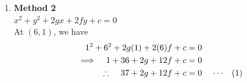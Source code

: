 \documentclass[11pt,a4paper]{article}
\begin{document}
\begin{enumerate}
Gradient of $BC =\dfrac{3 - 2}{2 - 3} = -1$ 


$$\therefore \hspace{0.5cm} y - 2\dfrac{1}{2} = 1\Big(x - 2\dfrac{1}{2}\Big)$$

$$\implies \hspace{0.4cm} y = x \hspace{0.5cm}\cdots\hspace{0.4cm} (2)$$



\begin{align*}
\text{Now},\hspace{1cm} 2y - x - 6 & = 0\\
 y & = x\\\\
 \implies \hspace{0.4cm} 2x - x & = 6
\end{align*}

$$x = 6\hspace{0.5cm},\hspace{0.5cm} y = 6$$

$\therefore\hspace{0.5cm} (6,6)\hspace{0.2cm}$ is the centre of the circle.

$$r^2 = (6-1)^2 + (6-6)^2 = 25$$

Our equation in standard form is \hspace{0.2cm}$(x  - 6)^2 + (y - 6)^2  = 25$\\




\item[]\textbf{Method 2}\\

$x^2  + y^2 + 2gx + 2fy + c = 0$\\


At $(6,1)$, we have
\begin{align*}
1^2 + 6^2 + 2g(1) + 2(6)f + c & = 0\\
\implies \hspace{0.3cm} 1 + 36 + 2g + 12f + c & = 0\\
\therefore\hspace{0.4cm} 37 + 2g + 12f + c & =  0\hspace{0.4cm} \cdots\hspace{0.3cm} (1)\\
\end{align*}






\end{enumerate}
\end{document}
